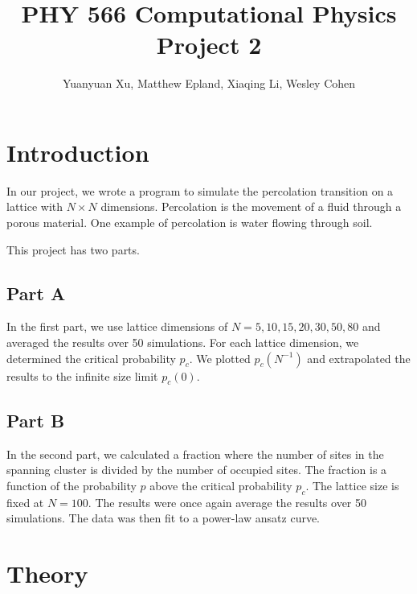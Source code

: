 \documentclass[12pt]{article}
\begin{document}
	
\title{PHY 566 Computational Physics Project 2}
\author{Yuanyuan Xu, Matthew Epland, Xiaqing Li, Wesley Cohen}
\maketitle

\section{Introduction}
\indent \indent In our project, we wrote a program to simulate the percolation transition on a lattice with $N \times N$ dimensions. Percolation is the movement of a fluid through a porous material. One example of percolation is water flowing through soil.  

This project has two parts.

\subsection{Part A}
\indent \indent In the first part, we use lattice dimensions of $N=5, 10, 15, 20, 30, 50, 80$ and averaged the results over 50 simulations. For each lattice dimension, we determined the critical probability $p_c$. We plotted $p_c(N^{-1})$ and extrapolated the results to the infinite size limit $p_c(0)$.

\subsection{Part B}
\indent \indent In the second part, we calculated a fraction where the number of sites in the spanning cluster is divided by the number of occupied sites. The fraction is a function of the probability $p$ above the critical probability $p_c$. The lattice size is fixed at $N=100$. The results were once again average the results over 50 simulations. The data was then fit to a power-law ansatz curve.

\section{Theory}
\end{document}
